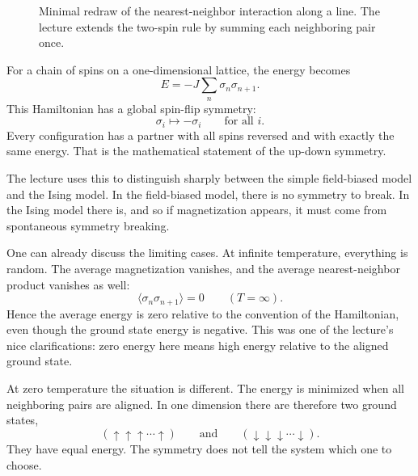 \begin{figure}
\centering
{}
\caption{Minimal redraw of the nearest-neighbor interaction along a line. The lecture extends the two-spin rule by summing each neighboring pair once.}
\end{figure}

For a chain of spins on a one-dimensional lattice, the energy becomes
\begin{equation}
E=-J\sum_n \sigma_n \sigma_{n+1}.
\end{equation}
This Hamiltonian has a global spin-flip symmetry:
\begin{equation}
\sigma_i \mapsto -\sigma_i
\qquad \text{for all } i.
\end{equation}
Every configuration has a partner with all spins reversed and with exactly the same energy. That is the mathematical statement of the up-down symmetry.

The lecture uses this to distinguish sharply between the simple field-biased model and the Ising model. In the field-biased model, there is no symmetry to break. In the Ising model there is, and so if magnetization appears, it must come from spontaneous symmetry breaking.

One can already discuss the limiting cases. At infinite temperature, everything is random. The average magnetization vanishes, and the average nearest-neighbor product vanishes as well:
\begin{equation}
\langle \sigma_n \sigma_{n+1}\rangle = 0
\qquad (T=\infty).
\end{equation}
Hence the average energy is zero relative to the convention of the Hamiltonian, even though the ground state energy is negative. This was one of the lecture's nice clarifications: zero energy here means high energy relative to the aligned ground state.

At zero temperature the situation is different. The energy is minimized when all neighboring pairs are aligned. In one dimension there are therefore two ground states,
\begin{equation}
(\uparrow \uparrow \uparrow \cdots \uparrow)
\qquad \text{and} \qquad
(\downarrow \downarrow \downarrow \cdots \downarrow).
\end{equation}
They have equal energy. The symmetry does not tell the system which one to choose.

